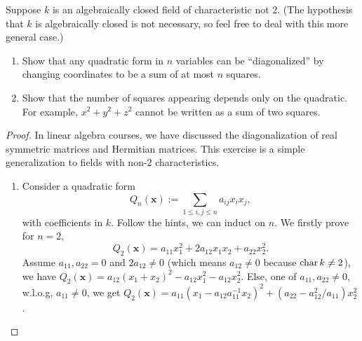 \documentclass[11pt]{book} %
\begin{document}
\begin{exr}\label{chap5exr:quadratic_forms_diagonalization}
Suppose $k$ is an algebraically closed field of characteristic not $2$. (The hypothesis that $k$ is algebraically closed is not necessary, so feel free to deal with this more general case.)
\begin{enumerate}[label=(\alph*)]
\item Show that any quadratic form in $n$ variables can be ``diagonalized'' by changing coordinates to be a sum of at most $n$ squares.
\item Show that the number of squares appearing depends only on the quadratic. For example, $x^2 + y^2 + z^2$ cannot be written as a sum of two squares.
\end{enumerate}
\end{exr}
\begin{proof}
In linear algebra courses, we have discussed the diagonalization of real symmetric matrices and Hermitian matrices. This exercise is a simple generalization to fields with non-2 characteristics.
\begin{enumerate}[label=(\alph*)]
\item Consider a quadratic form 
$$
Q_{n}(\mathbf{x}):=\sum_{1\leq i,j\leq n}a_{ij}x_ix_j,
$$
with coefficients in $k$.
Follow the hints, we can induct on $n$. We firstly prove for $n=2$,
$$
Q_2(\mathbf{x})=a_{11}x_1^2+2a_{12}x_1x_2+a_{22}x_2^2.
$$
Assume $a_{11},a_{22}=0$ and $2a_{12}\neq 0$ (which means $a_{12}\neq 0$ because $\text{char\,} k\neq 2$), we have $Q_{2}(\mathbf{x})=a_{12}(x_1+x_2)^2-a_{12}x_1^2-a_{12}x_2^2$. Else, one of $a_{11},a_{22}\neq 0$, w.l.o.g, $a_{11}\neq 0$, we get $Q_2(\mathbf{x})=a_{11}(x_1-a_{12}a_{11}^{-1}x_2)^2+(a_{22}-a_{12}^2/a_{11})x_2^2$.


\end{enumerate}
\end{proof}
\end{document}
